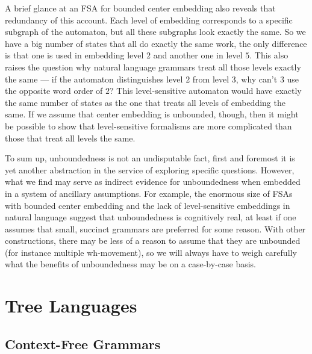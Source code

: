 A brief glance at an FSA for bounded center embedding also reveals that redundancy of this account.
Each level of embedding corresponds to a specific subgraph of the automaton, but all these subgraphs look exactly the same.
So we have a big number of states that all do exactly the same work, the only difference is that one is used in embedding level $2$ and another one in level $5$.
This also raises the question why natural language grammars treat all those levels exactly the same --- if the automaton distinguishes level $2$ from level $3$, why can't $3$ use the opposite word order of $2$?
This level-sensitive automaton would have exactly the same number of states as the one that treats all levels of embedding the same.
If we assume that center embedding is unbounded, though, then it might be possible to show that level-sensitive formalisms are more complicated than those that treat all levels the same.

To sum up, unboundedness is not an undisputable fact, first and foremost it is yet another abstraction in the service of exploring specific questions.
However, what we find may serve as indirect evidence for unboundedness when embedded in a system of ancillary assumptions.
For example, the enormous size of FSAs with bounded center embedding and the lack of level-sensitive embeddings in natural language suggest that unboundedness is cognitively real, at least if one assumes that small, succinct grammars are preferred for some reason.
With other constructions, there may be less of a reason to assume that they are unbounded (for instance multiple wh-movement), so we will always have to weigh carefully what the benefits of unboundedness may be on a case-by-case basis.

\section{Tree Languages}

\subsection{Context-Free Grammars}

